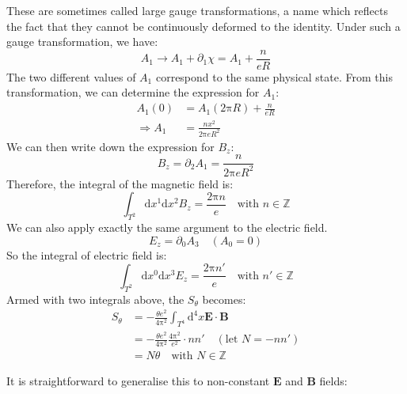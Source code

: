 These are sometimes called large gauge transformations, a name which reflects the fact that they cannot be continuously deformed to the identity. Under such a gauge transformation, we have:
\begin{equation}
A_1 \to A_1 + \partial_1 \chi = A_1 + \frac{n}{eR}
\end{equation}
The two different values of $A_1$ correspond to the same physical state. From this transformation, we can determine the expression for $A_1$:
\begin{equation}
\begin{aligned}
A_1(0) &= A_1(2\mathrm{\pi} R) + \frac{n}{eR} \\
\Rightarrow A_1 &= \frac{n x^2}{2\mathrm{\pi} e R^2}
\end{aligned}
\end{equation}
We can then write down the expression for $B_z$:
\begin{equation}
B_z = \partial_2 A_1 = \frac{n}{2\mathrm{\pi} e R^2}
\end{equation}
Therefore, the integral of the magnetic field is:
\begin{equation}
\int_{T^2} \mathrm{d}x^1 \mathrm{d}x^2 B_z = \frac{2\mathrm{\pi} n}{e} \quad \text{with } n \in \mathbb{Z}
\end{equation}
We can also apply exactly the same argument to the electric field.
\begin{equation}
E_z = \partial_0 A_3 \quad (A_0 = 0)
\end{equation}
So the integral of electric field is:
\begin{equation}
\int_{T^2} \mathrm{d}x^0 \mathrm{d}x^3 E_z = \frac{2\mathrm{\pi} n'}{e} \quad \text{with } n' \in \mathbb{Z}
\end{equation}
Armed with two integrals above, the $S_\theta$ becomes:
\begin{equation}
    \begin{aligned}
    S_\theta &= -\frac{\theta e^2}{4\mathrm{\pi}^2} \int_{T^4} \mathrm{d}^4x \bm{E} \cdot \bm{B} \\
    &= -\frac{\theta e^2}{4\mathrm{\pi}^2} \frac{4\mathrm{\pi}^2}{e^2} \cdot n n' \quad (\text{let } N = -nn') \\
    &= N \theta \quad \text{with } N \in \mathbb{Z}
    \end{aligned}
\end{equation}

It is straightforward to generalise this to non-constant $\bm{E}$ and $\bm{B}$ fields:

